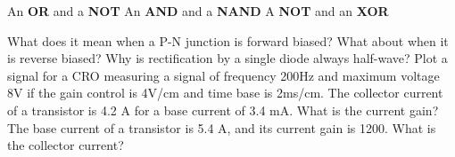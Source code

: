 \documentclass[12pt,addpoints]{exam}
\begin{document}
\begin{questions}
\begin{choices}
		\choice An \textbf{OR} and a \textbf{NOT}
		\choice An \textbf{AND} and a \textbf{NAND}
		\choice A \textbf{NOT} and an \textbf{XOR}
	\end{choices}
	\question What does it mean when a P-N junction is forward biased? What about when it is reverse biased?
	\question Why is rectification by a single diode always half-wave?
	\question Plot a signal for a CRO measuring a signal of frequency 200Hz and maximum voltage 8V if the gain control is 4V/cm and time base is 2ms/cm.
	\question The collector current of a transistor is 4.2 A for a base current of 3.4 mA. What is the current gain?
	\question The base current of a transistor is 5.4 A, and its current gain is 1200. What is the collector current?
	\end{questions}		
\end{document}
